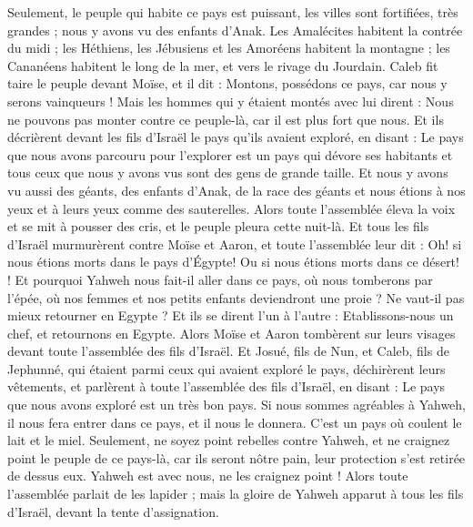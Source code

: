 \begin{multicols}{2}
Seulement, le peuple qui habite ce pays est puissant, les villes sont fortifiées, très grandes ; nous y avons vu des enfants d'Anak.
Les Amalécites habitent la contrée du midi ; les Héthiens, les Jébusiens et les Amoréens habitent la montagne ; les Cananéens habitent le long de la mer, et vers le rivage du Jourdain.
Caleb fit taire le peuple devant Moïse, et il dit : Montons, possédons ce pays, car nous y serons vainqueurs !
Mais les hommes qui y étaient montés avec lui dirent : Nous ne pouvons pas monter contre ce peuple-là, car il est plus fort que nous.
Et ils décrièrent devant les fils d'Israël le pays qu'ils avaient exploré, en disant  : Le pays que nous avons parcouru pour l'explorer est un pays qui dévore ses habitants et  tous ceux que nous y avons vus sont des gens de grande taille.
Et nous y avons vu aussi des géants, des enfants d'Anak, de la race des géants et nous étions à nos yeux et à leurs yeux comme des sauterelles.
\VerseOne{}Alors toute l'assemblée éleva la voix et se mit à pousser des cris, et le peuple pleura cette nuit-là.
Et tous les fils d'Israël murmurèrent contre Moïse et Aaron, et toute l'assemblée leur dit : Oh! si nous étions morts dans le pays d’Égypte! Ou si nous étions morts dans ce désert! !
Et pourquoi Yahweh nous fait-il aller dans ce pays, où nous tomberons par l'épée, où nos femmes et nos petits enfants deviendront une proie ? Ne vaut-il pas mieux retourner en Egypte ?
Et ils se dirent l'un à l'autre : Etablissons-nous un chef, et retournons en Egypte.
Alors Moïse et Aaron tombèrent sur leurs visages devant toute l'assemblée des fils d'Israël.
Et Josué, fils de Nun, et Caleb, fils de Jephunné, qui étaient parmi ceux qui avaient exploré le pays, déchirèrent leurs vêtements,
et parlèrent à toute l'assemblée des fils d'Israël, en disant : Le pays que nous avons exploré est un très bon pays.
Si nous sommes agréables à Yahweh, il nous fera entrer dans ce pays, et il nous le donnera. C'est un pays où coulent le lait et le miel.
Seulement, ne soyez point rebelles contre Yahweh, et ne craignez point le peuple de ce pays-là, car ils seront nôtre pain, leur protection s’est retirée de dessus eux. Yahweh est avec nous, ne les craignez point !
Alors toute l'assemblée parlait de les lapider ; mais la gloire de Yahweh apparut à tous les fils d'Israël, devant la tente d'assignation.

\end{multicols}
